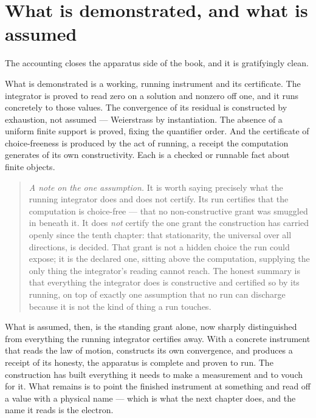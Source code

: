 \section{What is demonstrated, and what is assumed}
\label{se:demonstrated-assumed-ch18}

The accounting closes the apparatus side of the book, and it is gratifyingly clean.

What is demonstrated is a working, running instrument and its certificate. The integrator is proved to
read zero on a solution and nonzero off one, and it runs concretely to those values. The convergence of
its residual is constructed by exhaustion, not assumed --- Weierstrass by instantiation. The absence of
a uniform finite support is proved, fixing the quantifier order. And the certificate of choice-freeness
is produced by the act of running, a receipt the computation generates of its own constructivity. Each
is a checked or runnable fact about finite objects.

\begin{quote}
\emph{A note on the one assumption.} It is worth saying precisely what the running integrator does and
does not certify. Its run certifies that the computation is choice-free --- that no non-constructive
grant was smuggled in beneath it. It does \emph{not} certify the one grant the construction has carried
openly since the tenth chapter: that stationarity, the universal over all directions, is decided. That
grant is not a hidden choice the run could expose; it is the declared one, sitting above the
computation, supplying the only thing the integrator's reading cannot reach. The honest summary is that
everything the integrator does is constructive and certified so by its running, on top of exactly one
assumption that no run can discharge because it is not the kind of thing a run touches.
\end{quote}

What is assumed, then, is the standing grant alone, now sharply distinguished from everything the
running integrator certifies away. With a concrete instrument that reads the law of motion, constructs
its own convergence, and produces a receipt of its honesty, the apparatus is complete and proven to run.
The construction has built everything it needs to make a measurement and to vouch for it. What remains is
to point the finished instrument at something and read off a value with a physical name --- which is
what the next chapter does, and the name it reads is the electron.
